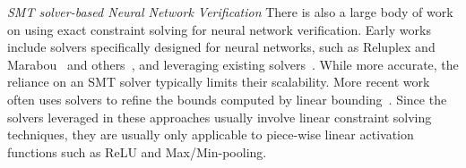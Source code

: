
\textit{SMT solver-based Neural Network Verification}
There is also a large body of work on using exact constraint solving for neural
network verification. Early works include solvers specifically designed for
neural networks, such as Reluplex and
Marabou~\cite{KatzBDJK17,KatzHIJLLSTWZDK19} and others~\cite{DvijothamSGMK18},
and leveraging existing
solvers~\cite{Ehlers17,HuangKWW17,BastaniILVNC16,HuangKWW17,baluta2019quantitative,tjeng2019evaluating,hu2020reach}.
 While more accurate, the reliance on an SMT solver typically limits their
 scalability. More recent work
often uses solvers to refine the bounds computed by linear
bounding~\cite{Singh2019krelu,SinghGPV19iclr,WangPWYJ18nips,tran2019star,tran2020verification}.
Since the solvers leveraged in these approaches usually involve linear
constraint solving techniques, they are usually only applicable to piece-wise
linear activation functions such as ReLU and Max/Min-pooling.


%

